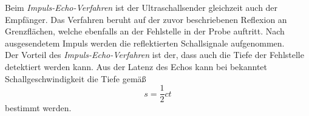 Beim \textit{Impuls-Echo-Verfahren} ist der Ultraschallsender gleichzeit auch der Empfänger. Das Verfahren
beruht auf der zuvor beschriebenen Reflexion an Grenzflächen, welche ebenfalls an der Fehlstelle in
der Probe auftritt. Nach ausgesendetem Impuls werden die reflektierten Schallsignale aufgenommen.
\\
Der Vorteil des \textit{Impuls-Echo-Verfahren} ist der, dass auch die Tiefe der Fehlstelle detektiert
werden kann. Aus der Latenz des Echos kann bei bekanntet Schallgeschwindigkeit die Tiefe gemäß
\begin{equation}
	\label{eqn:tiefe_fehlstelle}
	s = \frac12 ct
\end{equation}
bestimmt werden.

